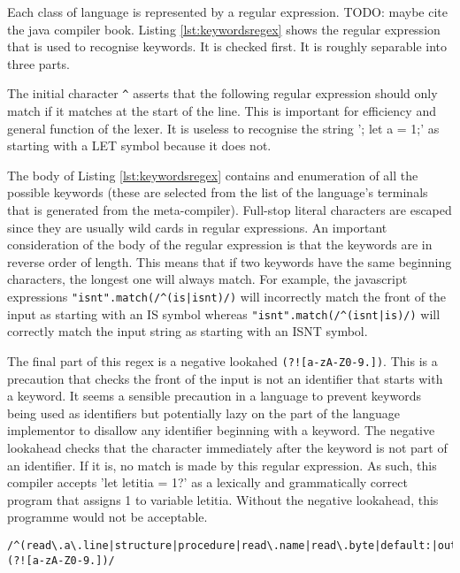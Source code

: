 \documentclass{article}
\begin{document}
Each class of language is represented by a regular expression. TODO: maybe cite the java compiler book. 
Listing \ref{lst:keywordsregex} shows the regular expression that is used to recognise keywords. It is checked first. It is roughly separable into three parts.

The initial character \lstinline{^} asserts that the following regular expression should only match if it matches at the start of the line. This is important for efficiency and general function of the lexer. It is useless to recognise the string '; let a = 1;' as starting with a LET symbol because it does not.

The body of Listing \ref{lst:keywordsregex} contains and enumeration of all the possible keywords (these are selected from the list of the language's terminals that is generated from the meta-compiler). Full-stop literal characters are escaped since they are usually wild cards in regular expressions. An important consideration of the body of the regular expression is that the keywords are in reverse order of length. This means that if two keywords have the same beginning characters, the longest one will always match. For example, the javascript expressions \lstinline{"isnt".match(/^(is|isnt)/)} will incorrectly match the front of the input as starting with an IS symbol whereas \lstinline{"isnt".match(/^(isnt|is)/)} will correctly match the input string as starting with an ISNT symbol.

The final part of this regex is a negative lookahed \lstinline{(?![a-zA-Z0-9.])}. This is a precaution that checks the front of the input is not an identifier that starts with a keyword. It seems a sensible precaution in a language to prevent keywords being used as identifiers but potentially lazy on the part of the language implementor to disallow any identifier beginning with a keyword. The negative lookahead checks that the character immediately after the keyword is not part of an identifier. If it is, no match is made by this regular expression. As such, this compiler accepts 'let letitia = 1?' as a lexically and grammatically correct program that assigns 1 to variable letitia. Without the negative lookahead, this programme would not be acceptable.

\begin{lstlisting}[caption={},label={lst:keywordsregex}, escapechar="|"]
/^(read\.a\.line|structure|procedure|read\.name|read\.byte|default:|out\.byte|nullfile|forward|read\.32|#cpixel|maxreal|epsilon|read\.16|screen|maxint|repeat|#pixel|string|cursor|colour|rotate|out\.32|output|vector|out\.16|write|pixel|reads|readb|readr|image|limit|shift|scale|readi|begin|while|abort|false|peek|true|rand|onto|text|read|case|xnor|nand|from|copy|else|then|real|file|pntr|bool|isnt|end|xor|lwb|and|ror|upb|eof|int|off|nil|for|let|r\.w|i\.w|s\.w|s\.o|s\.i|div|rem|pic|nor|not|on|pi|do|is|by|if|to|of|at|or|in)(?![a-zA-Z0-9.])/
\end{lstlisting}
\end{document}
